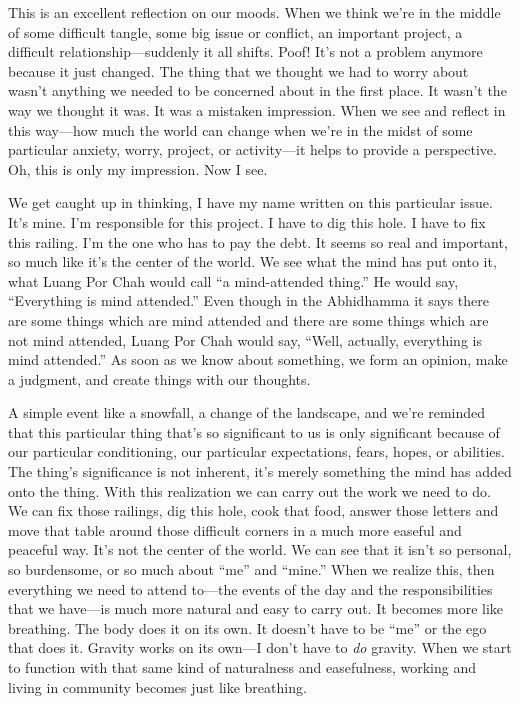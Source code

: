 This is an excellent reflection on our moods. When we think we're in 
the middle of some difficult tangle, some big issue or conflict, an 
important project, a difficult relationship---suddenly it all shifts. 
Poof! It's not a problem anymore because it just changed. The thing 
that we thought we had to worry about wasn't anything we needed to be 
concerned about in the first place. It wasn't the way we thought it 
was. It was a mistaken impression. When we see and reflect in this 
way---how much the world can change when we're in the midst of some 
particular anxiety, worry, project, or activity---it helps to provide a 
perspective. Oh, this is only my impression. Now I see.

We get caught up in thinking, I have my name written on this particular 
issue. It's mine. I'm responsible for this project. I have to dig this 
hole. I have to fix this railing. I'm the one who has to pay the debt. 
It seems so real and important, so much like it's the center of the 
world. We see what the mind has put onto it, what Luang Por Chah would 
call ``a mind-attended thing.'' He would say, ``Everything is mind 
attended.'' Even though in the Abhidhamma it says there are some things 
which are mind attended and there are some things which are not mind 
attended, Luang Por Chah would say, ``Well, actually, everything is 
mind attended.'' As soon as we know about something, we form an 
opinion, make a judgment, and create things with our thoughts.

A simple event like a snowfall, a change of the landscape, and we're 
reminded that this particular thing that's so significant to us is only 
significant because of our particular conditioning, our particular 
expectations, fears, hopes, or abilities. The thing's significance is 
not inherent, it's merely something the mind has added onto the thing. 
With this realization we can carry out the work we need to do. We can 
fix those railings, dig this hole, cook that food, answer those letters 
and move that table around those difficult corners in a much more 
easeful and peaceful way. It's not the center of the world. We can see 
that it isn't so personal, so burdensome, or so much about ``me'' and 
``mine.'' When we realize this, then everything we need to attend 
to---the events of the day and the responsibilities that we have---is 
much more natural and easy to carry out. It becomes more like 
breathing. The body does it on its own. It doesn't have to be ``me'' or 
the ego that does it. Gravity works on its own---I don't have to 
\emph{do} gravity. When we start to function with that same kind of 
naturalness and easefulness, working and living in community becomes 
just like breathing.

